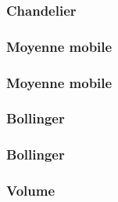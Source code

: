 \begin{frame}
    \frametitle{Chandelier}
  

\end{frame}

\begin{frame}
    \frametitle{Moyenne mobile}
  

\end{frame}

\begin{frame}
    \frametitle{Moyenne mobile}
  

\end{frame}

\begin{frame}
    \frametitle{Bollinger}
  

\end{frame}

\begin{frame}
    \frametitle{Bollinger}
  

\end{frame}

\begin{frame}
    \frametitle{Volume}
  

\end{frame}
